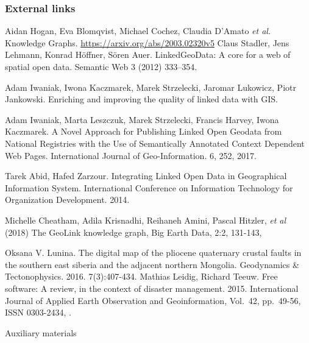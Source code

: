 \documentclass[10pt]{beamer}
\begin{document}
\begin{frame}
  \frametitle{External links}\tiny
  \begin{thebibliography}{99}
 Aidan Hogan, Eva Blomqvist, Michael Cochez, Claudia D’Amato \emph{et al}. Knowledge Graphs. \url{https://arxiv.org/abs/2003.02320v5}
 Claus Stadler, Jens Lehmann, Konrad Höffner, Sören Auer. LinkedGeoData: A core for a web of spatial open data. Semantic Web 3 (2012) 333–354. 

 Adam Iwaniak, Iwona Kaczmarek, Marek Strzelecki, Jaromar Lukowicz, Piotr Jankowski. Enriching and improving the quality of linked data with GIS. 

 Adam Iwaniak, Marta Leszczuk, Marek Strzelecki, Francis Harvey, Iwona Kaczmarek. A Novel Approach for Publishing Linked Open Geodata from National Registries with the Use of Semantically Annotated Context Dependent Web Pages. International Journal of Geo-Information. 6, 252, 2017. 

 Tarek Abid, Hafed Zarzour. Integrating Linked Open Data in Geographical
Information System. International Conference on Information Technology for Organization Development. 2014.

 Michelle Cheatham, Adila Krisnadhi, Reihaneh Amini, Pascal Hitzler, \emph{et al} (2018) The GeoLink knowledge graph, Big Earth Data, 2:2, 131-143, 

 Oksana V. Lunina.  The digital map of the pliocene quaternary crustal faults in the southern east siberia and the adjacent northern Mongolia. Geodynamics \& Tectonophysics. 2016. 7(3):407-434. 
 Mathias Leidig, Richard Teeuw. Free software: A review, in the context of disaster management. 2015. International Journal of Applied Earth Observation and Geoinformation,
Vol.~42, pp.~49-56, ISSN 0303-2434, .
\end{thebibliography}
\end{frame}

\begin{frame}
  \begin{center}
  \Large Auxiliary materials
\end{center}
\end{frame}


\end{document}
